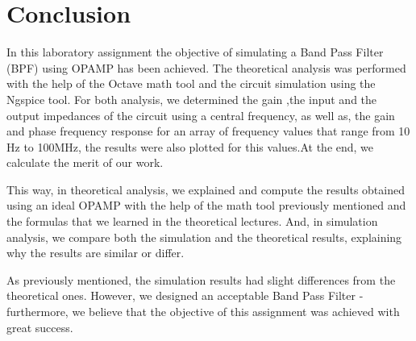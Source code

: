 \section{Conclusion}
\label{sec:conclusion}

In this laboratory assignment the objective of simulating a Band Pass Filter (BPF) using OPAMP has been achieved. The theoretical analysis was performed with the help of the Octave math tool and the circuit simulation using the Ngspice tool. For both analysis, we determined the gain ,the input and the output impedances of the circuit using a central frequency, as well as, the gain and phase frequency response for an array of frequency values that range from 10 Hz to 100MHz, the results were also plotted for this values.At the end, we calculate the merit of our work.

This way, in theoretical analysis, we explained and compute the results obtained using an ideal OPAMP with the help of the math tool previously mentioned and the formulas that we learned in the theoretical lectures. And, in simulation analysis, we compare both the simulation and the theoretical results, explaining why the results are similar or differ.

 As previously mentioned, the simulation results had slight differences from the theoretical ones. However, we designed an acceptable Band Pass Filter - furthermore, we believe that the objective of this assignment was achieved with great success.
